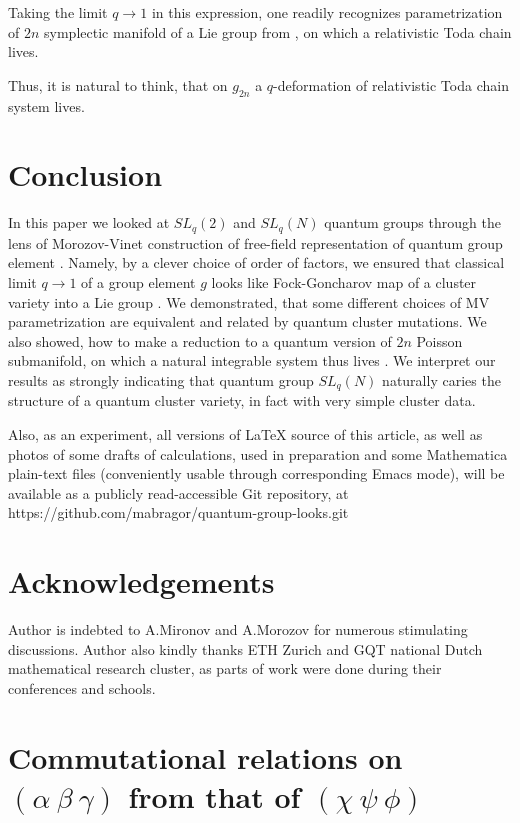 \documentclass{article}
\newcommand {\?}{\textit{???}}
\def\classlim{q \rightarrow 1}
\begin{document}
Taking the limit $\classlim$ in this expression, one readily recognizes
parametrization of $2n$ symplectic manifold of a Lie group from \cite{Mars1},
on which a relativistic Toda chain lives.


Thus, it is natural to think, that on $g_{2n}$ a $q$-deformation of relativistic Toda chain
system lives.

\section{Conclusion}
In this paper we looked at $SL_q(2)$ and $SL_q(N)$ quantum groups through
the lens of Morozov-Vinet construction of free-field representation of
quantum group element \cite{MV1}. Namely, by a clever choice of order of factors, we
ensured that classical limit $\classlim$ of a group element $g$ looks like
Fock-Goncharov map of a cluster variety into a Lie group \cite{FG2}.
We demonstrated, that some different choices of MV parametrization are equivalent
and related by quantum cluster mutations.
We also showed, how to make a reduction to a quantum version of $2n$ Poisson submanifold,
on which a natural integrable system thus lives \cite{Mars1}.
We interpret our results as strongly indicating that quantum group $SL_q(N)$ naturally
caries the structure of a quantum cluster variety, in fact with very simple cluster data.

Also, as an experiment, all versions of LaTeX source of this article, as well as
photos of some drafts of calculations, used in preparation
and some Mathematica plain-text files (conveniently usable through corresponding Emacs mode), will be available as
a publicly read-accessible Git repository, at
\\ https://github.com/mabragor/quantum-group-looks.git


\section*{Acknowledgements}

Author is indebted to A.Mironov and A.Morozov for numerous stimulating discussions.
Author also kindly thanks ETH Zurich and GQT national Dutch mathematical research cluster,
as parts of work were done during their conferences and schools.

\appendix

\section{Commutational relations on $(\alpha\ \beta\ \gamma)$ from that of $(\chi\ \psi\ \phi)$}
\label{sec:alpha-beta-gamma-from-chi-psi-phi}
\end{document}

